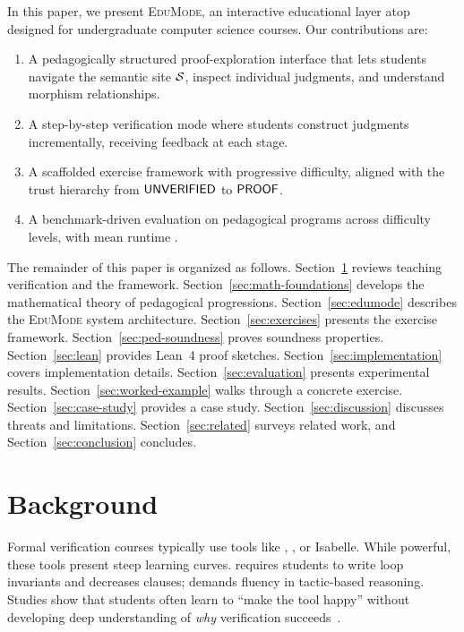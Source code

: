 \documentclass[11pt]{article}
\newcommand{\EduMode}{\textsc{EduMode}}
\begin{document}
In this paper, we present \EduMode{}, an interactive educational layer atop
\JuGeo{} designed for undergraduate computer science courses. Our
contributions are:
\begin{enumerate}[leftmargin=*]
  \item A pedagogically structured proof-exploration interface that lets
        students
        navigate the semantic site $\mathcal{S}$, inspect individual judgments,
        and understand morphism relationships.
  \item A step-by-step verification mode where students construct judgments
        incrementally, receiving feedback at each stage.
  \item A scaffolded exercise framework with progressive difficulty, aligned
        with the trust hierarchy from $\mathsf{UNVERIFIED}$ to $\mathsf{PROOF}$.
  \item A benchmark-driven evaluation on \ppLXVIprogramCount{} pedagogical
        programs across \ppLXVIlevelCount{} difficulty levels, with mean
        runtime \ppLXVItimeMean{}.
\end{enumerate}

The remainder of this paper is organized as follows.
Section~\ref{sec:background} reviews teaching verification and the \JuGeo{}
framework. Section~\ref{sec:math-foundations} develops the mathematical
theory of pedagogical progressions. Section~\ref{sec:edumode} describes
the \EduMode{} system architecture. Section~\ref{sec:exercises} presents
the exercise framework. Section~\ref{sec:ped-soundness} proves soundness
properties. Section~\ref{sec:lean} provides Lean~4 proof sketches.
Section~\ref{sec:implementation} covers implementation details.
Section~\ref{sec:evaluation} presents experimental results.
Section~\ref{sec:worked-example} walks through a concrete exercise.
Section~\ref{sec:case-study} provides a case study.
Section~\ref{sec:discussion} discusses threats and limitations.
Section~\ref{sec:related} surveys related work, and
Section~\ref{sec:conclusion} concludes.

\section{Background}\label{sec:background}

Formal verification courses typically use tools like \Dafny{}, \Coq{}, or
Isabelle. While powerful, these tools present steep learning curves. \Dafny{}
requires students to write loop invariants and decreases clauses; \Coq{}
demands fluency in tactic-based reasoning. Studies show that students often
learn to ``make the tool happy'' without developing deep understanding of
\emph{why} verification succeeds~\cite{pierce2019software}.
\end{document}
